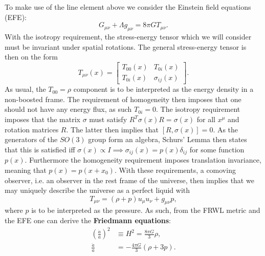 \documentclass[%
reprint,
 amsmath,amssymb,
 aps,
]{revtex4-2}
\begin{document}
To make use of the line element above we consider the Einstein field equations (EFE):
\begin{equation}
	G_{\mu\nu}+\Lambda g_{\mu\nu}=8\pi G T_{\mu\nu}.\label{eq:EFE}
\end{equation}
With the isotropy requirement, the stress-energy tensor which we will consider must be invariant under spatial rotations. The general stress-energy tensor is then on the form
\[T_{\mu\nu}(x)=\begin{bmatrix}
	T_{00}(x) & T_{0i}(x)\\
	T_{0i}(x) & \sigma_{ij}(x)
\end{bmatrix}.\]
As usual, the $T_{00}=\rho$ component is to be interpreted as the energy density in a non-boosted frame. The requirement of homogeneity then imposes that one should not have any energy flux, as such $T_{0i}=0$. The isotropy requirement imposes that the matrix $\sigma$ must satisfy $R^T\sigma(x) R=\sigma(x)$ for all $x^\mu$ and rotation matrices $R$. The latter then implies that $[R,\sigma(x)]=0$. As the generators of the $SO(3)$ group form an algebra, Schurs' Lemma then states that this is satisfied iff $\sigma(x)\propto I\implies \sigma_{ij}(x)=p(x)\delta_{ij}$ for some function $p(x)$. Furthermore the homogeneity requirement imposes translation invariance, meaning that $p(x)=p(x+x_0)$. With these requirements, a comoving observer, i.e. an observer in the rest frame of the universe, then implies that we may uniquely describe the universe as a perfect liquid with
\[T_{\mu\nu}=(\rho+p)u_\mu u_\nu+g_{\mu\nu}p,\]
where $p$ is to be interpreted as the pressure. As such, from the FRWL metric and the EFE one can derive the \textbf{Friedmann equations}:
\begin{align}
	\label{eq:F1}
	\left(\frac{\dot{a}}{a}\right)^2&\equiv H^2=\frac{8\pi G}{3}\rho,\\
	\label{eq:F2}
	\frac{\ddot{a}}{a}&=-\frac{4\pi G}{3}(\rho+3p).
\end{align}
\end{document}
